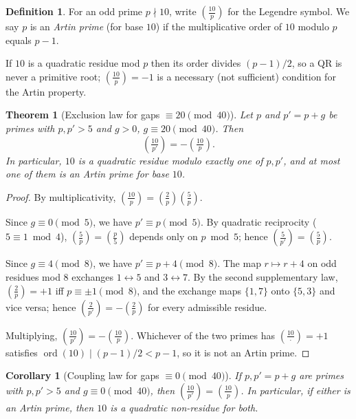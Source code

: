 \documentclass[11pt]{amsart}
\newtheorem{theorem}{Theorem}
\newtheorem{corollary}{Corollary}
\theoremstyle{definition}
\newtheorem{definition}{Definition}
\newcommand{\Lsym}[2]{\left(\tfrac{#1}{#2}\right)}
\begin{document}
\begin{definition}
	For an odd prime $p \nmid 10$, write $\Lsym{10}{p}$ for the Legendre symbol.
	We say $p$ is an \emph{Artin prime} (for base $10$) if the multiplicative order
	of $10$ modulo $p$ equals $p - 1$.
\end{definition}

If $10$ is a quadratic residue mod $p$ then its order divides $(p-1)/2$, so a
QR is never a primitive root; $\Lsym{10}{p} = -1$ is a necessary (not
sufficient) condition for the Artin property.

\begin{theorem}[Exclusion law for gaps $\equiv 20 \pmod{40}$]
	\label{thm:exclusion}
	Let $p$ and $p' = p + g$ be primes with $p, p' > 5$ and $g > 0$,
	$g \equiv 20 \pmod{40}$.
	Then
	\[
		\Lsym{10}{p'} = -\Lsym{10}{p}.
	\]
	In particular, $10$ is a quadratic residue modulo exactly one of $p, p'$, and
	at most one of them is an Artin prime for base $10$.
\end{theorem}

\begin{proof}
	By multiplicativity, $\Lsym{10}{p} = \Lsym{2}{p}\Lsym{5}{p}$.

	Since $g \equiv 0 \pmod 5$, we have $p' \equiv p \pmod 5$. By quadratic
	reciprocity ($5 \equiv 1 \bmod 4$), $\Lsym{5}{p} = \Lsym{p}{5}$ depends only on
	$p \bmod 5$; hence $\Lsym{5}{p'} = \Lsym{5}{p}$.

	Since $g \equiv 4 \pmod 8$, we have $p' \equiv p + 4 \pmod 8$. The map
	$r \mapsto r + 4$ on odd residues mod $8$ exchanges $1 \leftrightarrow 5$ and
	$3 \leftrightarrow 7$. By the second supplementary law,
	$\Lsym{2}{p} = +1$ iff $p \equiv \pm 1 \pmod 8$, and the exchange maps
	$\{1, 7\}$ onto $\{5, 3\}$ and vice versa; hence $\Lsym{2}{p'} = -\Lsym{2}{p}$
	for every admissible residue.

	Multiplying, $\Lsym{10}{p'} = -\Lsym{10}{p}$. Whichever of the two primes has
	$\Lsym{10}{\cdot} = +1$ satisfies $\operatorname{ord}(10) \mid (p-1)/2 < p-1$, so it
	is not an Artin prime.
\end{proof}

\begin{corollary}[Coupling law for gaps $\equiv 0 \pmod{40}$]
	\label{cor:coupling}
	If $p, p' = p + g$ are primes with $p, p' > 5$ and $g \equiv 0 \pmod{40}$, then
	$\Lsym{10}{p'} = \Lsym{10}{p}$. In particular, if either is an Artin prime,
	then $10$ is a quadratic non-residue for both.
\end{corollary}
\end{document}
